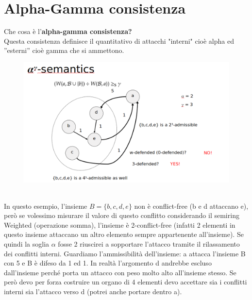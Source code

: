     \section{Alpha-Gamma consistenza}
    Che cosa è l'\textbf{alpha-gamma consistenza?} \\ Questa consistenza
    definisce il quantitativo di attacchi "interni" cioè alpha ed ”esterni” cioè
    gamma che si ammettono.
    \begin{figure}[htp]
        \centering
        \includegraphics[width=12cm, keepaspectratio]{img/Cap6/cons2.png}
    \end{figure}
    \\In questo esempio, l'insieme $B = \{b, c, d, e\}$ non è conflict-free (b e
    d attaccano e), però se volessimo misurare il valore di questo conflitto
    considerando il semiring Weighted (operazione somma), l'insieme è
    2-conflict-free (infatti 2 elementi in questo insieme attaccano un altro
    elemento sempre appartenente all'insieme). Se quindi la soglia $\alpha$
    fosse 2 riuscirei a sopportare l'attacco tramite il rilassamento dei
    conflitti interni. Guardiamo l'ammissibilità dell'insieme: a attacca
    l'insieme B con 5 e B è difeso da 1 ed 1. In realtà l'argomento d andrebbe
    escluso dall'insieme perché porta un attacco con peso molto alto all'insieme
    stesso. Se però devo per forza costruire un organo di 4 elementi devo
    accettare sia i conflitti interni sia l'attacco verso d (potrei anche
    portare dentro a).


